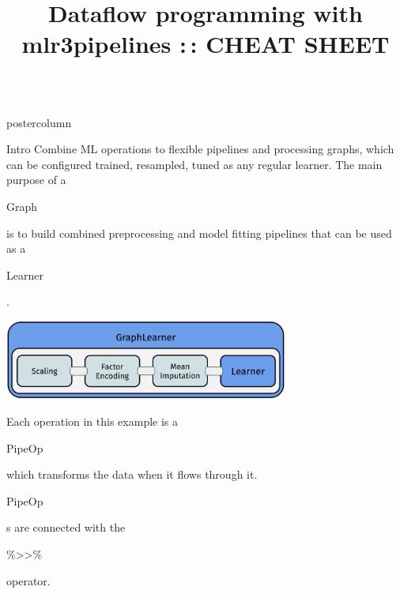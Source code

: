 \documentclass{beamer}
\title{Dataflow programming with mlr3pipelines :\,: CHEAT SHEET} %
\newlength{\columnheight} %
\newcommand{\codeinline}[1]{\begin{codeboxinline}#1\end{codeboxinline}}
\begin{document}
\begin{frame}[fragile]{}
	\begin{columns}
		\begin{column}{.245\textwidth}
			\begin{beamercolorbox}[center]{postercolumn}
				\begin{minipage}{.98\textwidth}
					\parbox[t][\columnheight]{\textwidth}{
						\begin{myblock}{Intro}
              Combine ML operations to flexible pipelines and processing graphs, which can be configured trained, resampled, tuned as any regular learner.
              The main purpose of a \codeinline{Graph} is to build combined preprocessing and model fitting pipelines that can be used as a \codeinline{Learner}. 
              \begin{center}
                \includegraphics[width=0.7\textwidth]{img/grl_linear.pdf}
              \end{center}
              Each operation in this example is a \codeinline{PipeOp} which transforms the data when it flows through it. \codeinline{PipeOp}s are connected with the \codeinline{\%>{}>\%} operator.
              

\end{myblock}}
\end{minipage}
\end{beamercolorbox}
\end{column}
\end{columns}
\end{frame}
\end{document}

